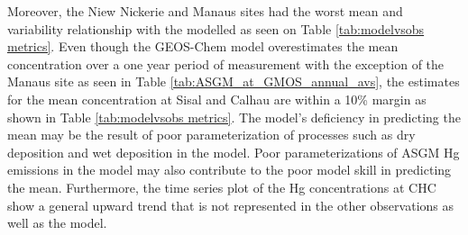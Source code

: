 \begin{flushleft}
Moreover, the Niew Nickerie and Manaus sites had the worst mean and variability relationship with the modelled \hg as seen on Table \ref{tab:modelvsobs metrics}. Even though the GEOS-Chem model overestimates the mean concentration over a one year period of measurement with the exception of the Manaus site as seen in Table \ref{tab:ASGM_at_GMOS_annual_avs}, the estimates for the mean concentration at Sisal and Calhau are within a 10\% margin as shown in Table \ref{tab:modelvsobs metrics}. The model's deficiency in predicting the mean may be the result of poor parameterization of processes such as dry deposition and wet deposition in the model. Poor parameterizations of ASGM Hg emissions in the model may also  contribute to the poor model skill in predicting the mean. Furthermore, the time series plot of the Hg concentrations at CHC show a general upward trend that is not represented in the other observations as well as the model. 
\end{flushleft}


\begin{flushleft}
  
\end{flushleft}

\begin{table}[H]
\label{tab:modelvsobs metrics}

\centering
{}

\end{table}
\begin{flushleft}
 
\end{flushleft}


